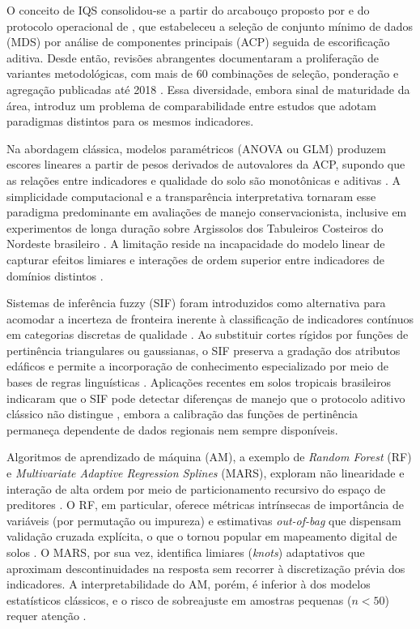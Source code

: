 \documentclass[pdflatex,sn-basic]{sn-jnl}%
\begin{document}
O conceito de IQS consolidou-se a partir do arcabouço proposto por \cite{Karlen1997} e do protocolo operacional de \cite{Andrews2002}, que estabeleceu a seleção de conjunto mínimo de dados (MDS) por análise de componentes principais (ACP) seguida de escorificação aditiva. Desde então, revisões abrangentes documentaram a proliferação de variantes metodológicas, com mais de 60 combinações de seleção, ponderação e agregação publicadas até 2018 \citep{Bunemann2018}. Essa diversidade, embora sinal de maturidade da área, introduz um problema de comparabilidade entre estudos que adotam paradigmas distintos para os mesmos indicadores.

Na abordagem clássica, modelos paramétricos (ANOVA ou GLM) produzem escores lineares a partir de pesos derivados de autovalores da ACP, supondo que as relações entre indicadores e qualidade do solo são monotônicas e aditivas \citep{Mukherjee2014}. A simplicidade computacional e a transparência interpretativa tornaram esse paradigma predominante em avaliações de manejo conservacionista, inclusive em experimentos de longa duração sobre Argissolos dos Tabuleiros Costeiros do Nordeste brasileiro \citep{Assuncao2023}. A limitação reside na incapacidade do modelo linear de capturar efeitos limiares e interações de ordem superior entre indicadores de domínios distintos \citep{DosSantos2021}.

Sistemas de inferência fuzzy (SIF) foram introduzidos como alternativa para acomodar a incerteza de fronteira inerente à classificação de indicadores contínuos em categorias discretas de qualidade \citep{Torbert2008}. Ao substituir cortes rígidos por funções de pertinência triangulares ou gaussianas, o SIF preserva a gradação dos atributos edáficos e permite a incorporação de conhecimento especializado por meio de bases de regras linguísticas \citep{Nabiollahi2018}. Aplicações recentes em solos tropicais brasileiros indicaram que o SIF pode detectar diferenças de manejo que o protocolo aditivo clássico não distingue \citep{DosSantos2021}, embora a calibração das funções de pertinência permaneça dependente de dados regionais nem sempre disponíveis.

Algoritmos de aprendizado de máquina (AM), a exemplo de \textit{Random Forest} (RF) e \textit{Multivariate Adaptive Regression Splines} (MARS), exploram não linearidade e interação de alta ordem por meio de particionamento recursivo do espaço de preditores \citep{Zeraatpisheh2020}. O RF, em particular, oferece métricas intrínsecas de importância de variáveis (por permutação ou impureza) e estimativas \textit{out-of-bag} que dispensam validação cruzada explícita, o que o tornou popular em mapeamento digital de solos \citep{Wadoux2020}. O MARS, por sua vez, identifica limiares (\textit{knots}) adaptativos que aproximam descontinuidades na resposta sem recorrer à discretização prévia dos indicadores. A interpretabilidade do AM, porém, é inferior à dos modelos estatísticos clássicos, e o risco de sobreajuste em amostras pequenas ($n < 50$) requer atenção \citep{Wadoux2020}.
\end{document}
